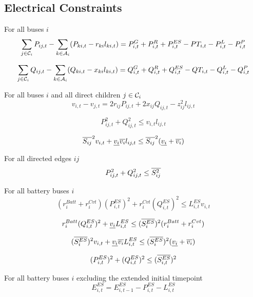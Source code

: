 \subsection{Electrical Constraints}

For all buses $i$ \atallt{}
\begin{equation}
  \sum_{j \in \mathcal C_i} P_{ij,t} - \sum_{k \in \mathcal A_i} (P_{ki,t} - r_{ki} l_{ki,t}) =
  P^G_{i,t} + P^R_{i,t} + P^{ES}_{i,t} - PT_{i,t} - P^L_{i,t} - P^P_{i,t}
\end{equation}

\begin{equation}
  \sum_{j \in \mathcal C_i} Q_{ij,t} - \sum_{k \in \mathcal A_i} (Q_{ki,t} - x_{ki} l_{ki,t}) =
  Q^G_{i,t} + Q^R_{i,t} + Q^{ES}_{i,t} - QT_{i,t} - Q^L_{i,t} - Q^P_{i,t}
\end{equation}


For all buses $i$ and all direct children $j \in \mathcal C_i$ \atallt{}
\begin{equation}
  v_{i,t} - v_{j,t} = 2r_{ij}P_{ij,t} + 2x_{ij}Q_{ij,t} - z^2_{ij}l_{ij,t}
\end{equation}

\begin{equation}
  P^2_{ij,t} + Q^2_{ij,t} \leq v_{i,t} l_{ij,t}
\end{equation}

\begin{equation}
  \overline{S_{ij}}^2v_{i,t} + \underline{v_i}\overline{v_i}l_{ij,t} \leq
  \overline{S_{ij}}^2 (\underline{v_i} + \overline{v_i})
\end{equation}

For all directed edges $ij$ \atallt{}
\begin{equation}
  P^2_{ij,t} + Q^2_{ij,t} \leq \overline{S^2_{ij}}
\end{equation}

For all battery buses $i$ \atallt{}
\begin{equation}
  (r^{Batt}_i + r^{Cvt}_i)(P^{ES}_{i,t})^2 + r^{Cvt}_i (Q^{ES}_{i,t})^2 \leq
  L^{ES}_{i,t}v_{i,t}
\end{equation}

\begin{equation}
  r^{Batt}_i (Q^{ES}_{i,t})^2 + \underline{v_i} L^{ES}_{i,t} \leq
  (\overline{S^{ES}_i})^2(r^{Batt}_i + r^{Cvt}_i)
\end{equation}

\begin{equation}
  (\overline{S^{ES}_i})^2v_{i,t} + \underline{v_i}\overline{v_i}L^{ES}_{i,t} \leq
  (\overline{S^{ES}_i})^2(\underline{v_i} + \overline{v_i})
\end{equation}

\begin{equation}
  (P^{ES}_{i,t})^2 + (Q^{ES}_{i,t})^2 \leq (\overline{S^{ES}_{i,t}})^2
\end{equation}

For all battery buses $i$ \atallextt{} excluding the extended initial timepoint
\begin{equation}
  E^{ES}_{i,t} = E^{ES}_{i,t-1} - P^{ES}_{i,t} - L^{ES}_{i,t}
\end{equation}
